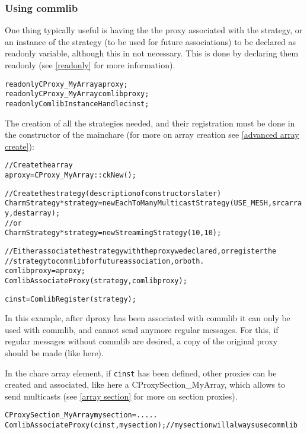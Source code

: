 \subsubsection{Using commlib}

One thing typically useful is having the the proxy associated with the strategy,
or an instance of the strategy (to be used for future associations) to be
declared as readonly variable, although this in not necessary. This is done by
declaring them readonly (see \ref{readonly} for more information).

\begin{alltt}
  readonly CProxy\_MyArray aproxy;
  readonly CProxy\_MyArray comlibproxy;
  readonly ComlibInstanceHandle cinst;
\end{alltt}

The creation of all the strategies needed, and their registration must be done
in the constructor of the mainchare (for more on array creation see
\ref{advanced array create}):

\begin{alltt}
  // Create the array
  aproxy = CProxy\_MyArray::ckNew();

  // Create the strategy (description of constructors later)
  CharmStrategy *strategy = new EachToManyMulticastStrategy(USE_MESH, srcarray, destarray);
  //or
  CharmStrategy *strategy = new StreamingStrategy(10,10);

  // Either associate the strategy with the proxy we declared, or register the
  // strategy to commlib for future association, or both.
  comlibproxy = aproxy;
  ComlibAssociateProxy(strategy, comlibproxy);

  cinst = ComlibRegister(strategy);
\end{alltt}

In this example, after dproxy has been associated with commlib it can only be
used with commlib, and cannot send anymore regular messages. For this, if
regular messages without commlib are desired, a copy of the original proxy
should be made (like here).

In the chare array element, if {\texttt{cinst}} has been defined, other proxies
can be created and associated, like here a CProxySection\_MyArray, which allows
to send multicasts (see \ref{array section} for more on section proxies).

\begin{alltt}
  CProxySection\_MyArray mysection = .....
  ComlibAssociateProxy(cinst, mysection);  // mysection will always use commlib
\end{alltt}

